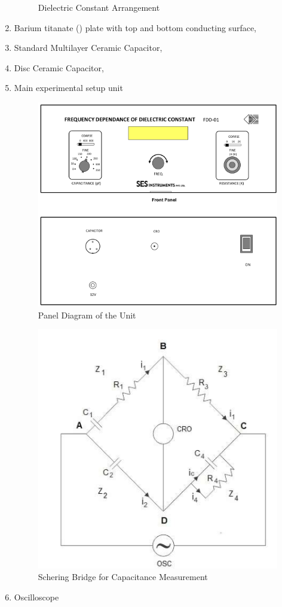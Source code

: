 \documentclass[%
 aip,
 amsmath,amssymb,
 reprint, floatfix%
]{revtex4-1}
\begin{document}
\begin{enumerate}
\begin{figure}
            \caption{Dielectric Constant Arrangement}
            \label{fig:probe}
        \end{figure}
        \item Barium titanate () plate with top and bottom conducting surface,
        \item Standard Multilayer Ceramic Capacitor,
        \item Disc Ceramic Capacitor,
        \item Main experimental setup unit
        \begin{figure}
            \centering
            \includegraphics[scale = 0.6]{Figures/panel.png}
            \caption{Panel Diagram of the Unit}
            \label{fig:panel}
        \end{figure}
        \begin{figure}
            \centering
            \includegraphics[scale = 0.8]{Figures/schering.png}
            \caption{Schering Bridge for Capacitance Measurement}
            \label{fig:schering}
        \end{figure}
        \item Oscilloscope
    \end{enumerate}
\end{document}
